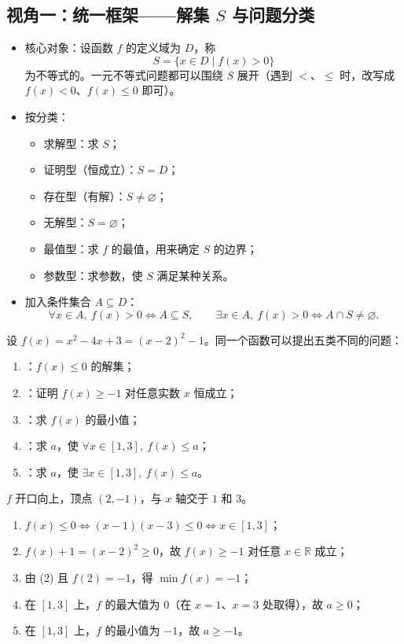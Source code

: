 \begin{explore}
\subsection{视角一：统一框架——解集 $S$ 与问题分类}

\begin{itemize}
  \item 核心对象：设函数 $f$ 的定义域为 $D$，称
  \[
    S=\{x\in D\mid f(x)>0\}
  \]
  为不等式的。一元不等式问题都可以围绕 $S$ 展开（遇到 $<$、$\leq$ 时，改写成 $f(x)<0$、$f(x)\leq0$ 即可）。
  \item 按分类：
  \begin{itemize}
    \item 求解型：求 $S$；
    \item 证明型（恒成立）：$S=D$；
    \item 存在型（有解）：$S\neq\varnothing$；
    \item 无解型：$S=\varnothing$；
    \item 最值型：求 $f$ 的最值，用来确定 $S$ 的边界；
    \item 参数型：求参数，使 $S$ 满足某种关系。
  \end{itemize}
  \item 加入条件集合 $A\subseteq D$：
  \[
    \forall x\in A,\ f(x)>0\iff A\subseteq S,\qquad
    \exists x\in A,\ f(x)>0\iff A\cap S\neq\varnothing.
  \]
\end{itemize}

\begin{example}
设 $f(x)=x^2-4x+3=(x-2)^2-1$。同一个函数可以提出五类不同的问题：
\begin{enumerate}
  \item {}：$f(x)\leq0$ 的解集；
  \item {}：证明 $f(x)\geq-1$ 对任意实数 $x$ 恒成立；
  \item {}：求 $f(x)$ 的最小值；
  \item {}：求 $a$，使 $\forall x\in[1,3],\ f(x)\leq a$；
  \item {}：求 $a$，使 $\exists x\in[1,3],\ f(x)\leq a$。
\end{enumerate}
\end{example}
\begin{solution}
$f$ 开口向上，顶点 $(2,-1)$，与 $x$ 轴交于 $1$ 和 $3$。
\begin{enumerate}
  \item $f(x)\leq0\iff (x-1)(x-3)\leq0\iff x\in[1,3]$；
  \item $f(x)+1=(x-2)^2\geq0$，故 $f(x)\geq-1$ 对任意 $x\in\mathbb{R}$ 成立；
  \item 由 (2) 且 $f(2)=-1$，得 $\min f(x)=-1$；
  \item 在 $[1,3]$ 上，$f$ 的最大值为 $0$（在 $x=1$、$x=3$ 处取得），故 $a\geq0$；
  \item 在 $[1,3]$ 上，$f$ 的最小值为 $-1$，故 $a\geq-1$。
\end{enumerate}
\end{solution}


\end{explore}
